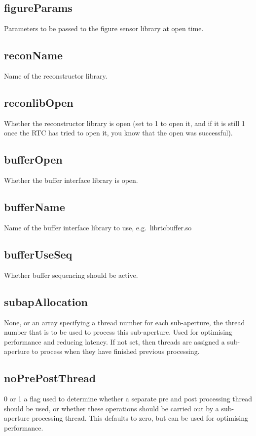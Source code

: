 \documentclass[a4,10pt]{article}
\begin{document}
\subsection{figureParams}
Parameters to be passed to the figure sensor library at open time.

\subsection{reconName}
Name of the reconstructor library.



\subsection{reconlibOpen}
Whether the reconstructor library is open (set to 1 to open it, and if
it is still 1 once the RTC has tried to open it, you know that the
open was successful).

\subsection{bufferOpen}
Whether the buffer interface library is open.

\subsection{bufferName}
Name of the buffer interface library to use, e.g.\ librtcbuffer.so

\subsection{bufferUseSeq}
Whether buffer sequencing should be active.

\subsection{subapAllocation}
None, or an array specifying a thread number for each sub-aperture,
the thread number that is to be used to process this sub-aperture.
Used for optimising performance and reducing latency.  If not set,
then threads are assigned a sub-aperture to process when they have
finished previous processing.

\subsection{noPrePostThread}
0 or 1 a flag used to determine whether a separate pre and post
processing thread should be used, or whether these operations should
be carried out by a sub-aperture processing thread.  This defaults to
zero, but can be used for optimising performance.
\end{document}
